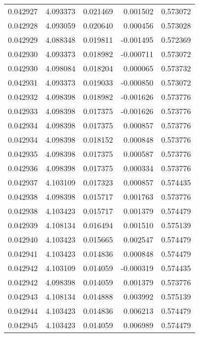 \begin{tabular}{lrrrr}
0.042927    &  4.093373 &  0.021469 &  0.001502 &             0.573072 \\
0.042928    &  4.093059 &  0.020640 &  0.000456 &             0.573028 \\
0.042929    &  4.088348 &  0.019811 & -0.001495 &             0.572369 \\
0.042930    &  4.093373 &  0.018982 & -0.000711 &             0.573072 \\
0.042930    &  4.098084 &  0.018204 &  0.000065 &             0.573732 \\
0.042931    &  4.093373 &  0.019033 & -0.000850 &             0.573072 \\
0.042932    &  4.098398 &  0.018982 & -0.001626 &             0.573776 \\
0.042933    &  4.098398 &  0.017375 & -0.001626 &             0.573776 \\
0.042934    &  4.098398 &  0.017375 &  0.000857 &             0.573776 \\
0.042934    &  4.098398 &  0.018152 &  0.000848 &             0.573776 \\
0.042935    &  4.098398 &  0.017375 &  0.000587 &             0.573776 \\
0.042936    &  4.098398 &  0.017375 &  0.000334 &             0.573776 \\
0.042937    &  4.103109 &  0.017323 &  0.000857 &             0.574435 \\
0.042938    &  4.098398 &  0.015717 &  0.001763 &             0.573776 \\
0.042938    &  4.103423 &  0.015717 &  0.001379 &             0.574479 \\
0.042939    &  4.108134 &  0.016494 &  0.001510 &             0.575139 \\
0.042940    &  4.103423 &  0.015665 &  0.002547 &             0.574479 \\
0.042941    &  4.103423 &  0.014836 &  0.000848 &             0.574479 \\
0.042942    &  4.103109 &  0.014059 & -0.000319 &             0.574435 \\
0.042942    &  4.098398 &  0.014059 &  0.001379 &             0.573776 \\
0.042943    &  4.108134 &  0.014888 &  0.003992 &             0.575139 \\
0.042944    &  4.103423 &  0.014836 &  0.006213 &             0.574479 \\
0.042945    &  4.103423 &  0.014059 &  0.006989 &             0.574479 \\

\end{tabular}
